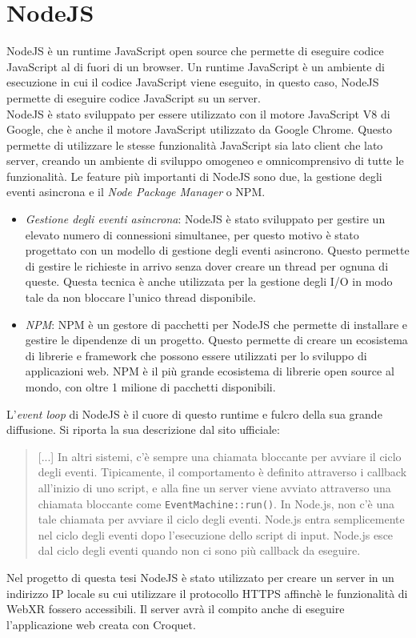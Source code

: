\section{NodeJS}\label{sec:NodeJS}
NodeJS è un runtime JavaScript open source che permette di eseguire codice JavaScript al di fuori di un browser\cite{NodeJS}. Un runtime JavaScript è un ambiente di esecuzione
in cui il codice JavaScript viene eseguito, in questo caso, NodeJS permette di eseguire codice JavaScript su un server.\\
NodeJS è stato sviluppato per essere utilizzato con il motore JavaScript V8 di Google, che è anche il motore JavaScript utilizzato da Google Chrome. Questo permette di utilizzare
le stesse funzionalità JavaScript sia lato client che lato server, creando un ambiente di sviluppo omogeneo e omnicomprensivo di tutte le funzionalità. Le feature più importanti
di NodeJS sono due, la gestione degli eventi asincrona e il \textit{Node Package Manager} o NPM.
\begin{itemize}
    \item \textit{Gestione degli eventi asincrona}: NodeJS è stato sviluppato per gestire un elevato numero di connessioni simultanee, per questo motivo è stato progettato con un
    modello di gestione degli eventi asincrono. Questo permette di gestire le richieste in arrivo senza dover creare un thread per ognuna di queste.
    Questa tecnica è anche utilizzata per la gestione degli I/O in modo tale da non bloccare l'unico thread disponibile.
    \item \textit{NPM}: NPM è un gestore di pacchetti per NodeJS che permette di installare e gestire le dipendenze di un progetto. Questo permette di creare un ecosistema di
    librerie e framework che possono essere utilizzati per lo sviluppo di applicazioni web. NPM è il più grande ecosistema di librerie open source al mondo, con oltre 1 milione
    di pacchetti disponibili.
\end{itemize}
L'\textit{event loop} di NodeJS è il cuore di questo runtime e fulcro della sua grande diffusione. Si riporta la sua descrizione dal sito ufficiale\cite{NodeJS}:
\begin{quote}
    [...] In altri sistemi, c'è sempre una chiamata bloccante per avviare il ciclo degli eventi. Tipicamente, il comportamento è definito attraverso i callback all'inizio di uno script, 
    e alla fine un server viene avviato attraverso una chiamata bloccante come \texttt{EventMachine::run()}. In Node.js, non c'è una tale chiamata per avviare il ciclo degli eventi. Node.js 
    entra semplicemente nel ciclo degli eventi dopo l'esecuzione dello script di input. Node.js esce dal ciclo degli eventi quando non ci sono più callback da eseguire.
\end{quote}
Nel progetto di questa tesi NodeJS è stato utilizzato per creare un server in un indirizzo IP locale su cui utilizzare il protocollo HTTPS affinchè le funzionalità di WebXR fossero
accessibili. Il server avrà il compito anche di eseguire l'applicazione web creata con Croquet.


